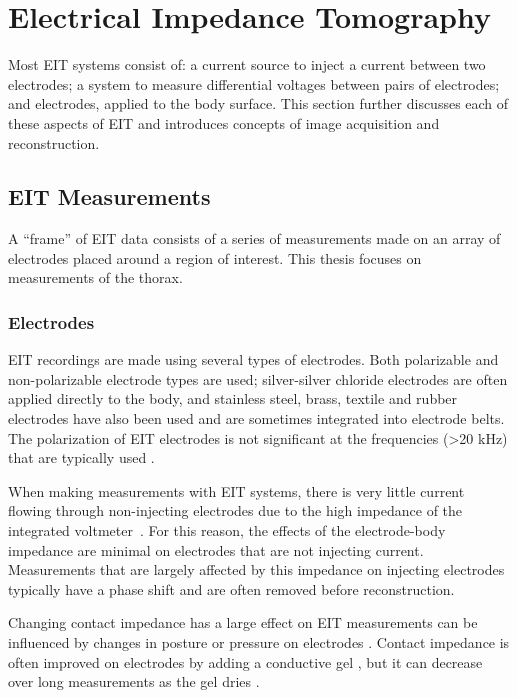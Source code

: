 \section{Electrical Impedance Tomography}

Most EIT systems consist of: 
a current source to inject a current between two electrodes;
a system to measure differential voltages between pairs of electrodes; and
electrodes, applied to the body surface.
This section further discusses each of these aspects of EIT 
and introduces concepts of image acquisition and reconstruction.


\subsection{EIT Measurements}
A ``frame'' of EIT data consists of a series of measurements made on an array
of electrodes placed around
a region of interest. This thesis focuses on measurements of the thorax. 

\subsubsection{Electrodes} \label{sec:electrodes}

EIT recordings are made using several types of electrodes. 
Both polarizable and non-polarizable
electrode types are used;
silver-silver chloride electrodes are often applied directly to the body,
and stainless steel, brass, textile and rubber electrodes have also 
been used and are sometimes 
integrated into electrode belts. 
The polarization of EIT electrodes is 
not significant at the frequencies (>20 kHz) that are typically used
\parencite{adler_electrical_2017}.

When making measurements with EIT systems, there is very little current flowing
through non-injecting electrodes due to the high impedance of the 
integrated voltmeter~\parencite{holder_electrical_2004}.
For this reason, the effects of the electrode-body impedance 
are minimal on electrodes that are not injecting current. Measurements that 
are largely affected by this impedance on injecting electrodes typically have a
phase shift and are often removed before reconstruction. 

Changing contact impedance has a large effect on EIT measurements 
can be influenced by changes in posture or pressure on electrodes 
\parencite{coulombe_parametric_2005}.
Contact impedance is often improved on electrodes by adding a
conductive gel \parencite{waldmann_performance_2017}, but it can decrease 
over long measurements as the gel dries \parencite{lozano_errors_1995}. 

